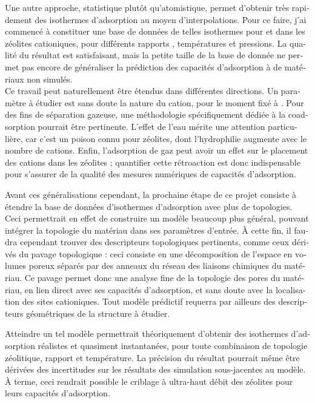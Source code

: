\documentclass[thesis]{subfiles}
\begin{document}
\begin{otherlanguage}{french}
Une autre approche, statistique plutôt qu'atomistique, permet d'obtenir très rapidement des isothermes d'adsorption au moyen d'interpolations. Pour ce faire, j'ai commencé à constituer une base de données de telles isothermes pour  et  dans les zéolites cationiques, pour différents rapports \SiAl, températures et pressions. La qualité du résultat est satisfaisant, mais la petite taille de la base de donnée ne permet pas encore de généraliser la prédiction des capacités d'adsorption à de matériaux non simulés.\\

Ce travail peut naturellement être étendus dans différentes directions. Un paramètre à étudier est sans doute la nature du cation, pour le moment fixé à . Pour des fins de séparation gazeuse, une méthodologie spécifiquement dédiée à la coadsorption pourrait être pertinente. L'effet de l'eau mérite une attention particulière, car c'est un poison connu pour zéolites, dont l'hydrophilie augmente avec le nombre de cations. Enfin, l'adsorption de gaz peut avoir un effet sur le placement des cations dans les zéolites ; quantifier cette rétroaction est donc indispensable pour s'assurer de la qualité des mesures numériques de capacités d'adsorption.

Avant ces généralisations cependant, la prochaine étape de ce projet consiste à étendre la base de données d'isothermes d'adsorption avec plus de topologies. Ceci permettrait en effet de construire un modèle beaucoup plus général, pouvant intégrer la topologie du matériau dans ses paramètres d'entrée. À cette fin, il faudra cependant trouver des descripteurs topologiques pertinents, comme ceux dérivés du pavage topologique : ceci consiste en une décomposition de l'espace en volumes poreux séparés par des anneaux du réseau des liaisons chimiques du matériau. Ce pavage permet donc une analyse fine de la topologie des pores du matériau, en lien direct avec ses capacités d'adsorption, et sans doute avec la localisation des sites cationiques. Tout modèle prédictif requerra par ailleurs des descripteurs géométriques de la structure à étudier.

Atteindre un tel modèle permettrait théoriquement d'obtenir des isothermes d'adsorption réalistes et quasiment instantanées, pour toute combinaison de topologie zéolitique, rapport \SiAl et température. La précision du résultat pourrait même être dérivées des incertitudes sur les résultats des simulation sous-jacentes au modèle. À terme, ceci rendrait possible le criblage à ultra-haut débit des zéolites pour leurs capacités d'adsorption.


\end{otherlanguage}
\end{document}
